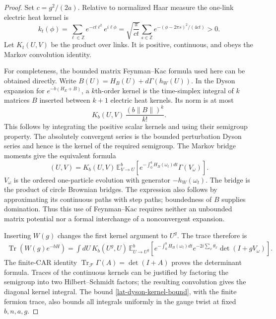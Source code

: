 \begin{proof}
Set $c=g^2/(2a)$.  Relative to normalized Haar measure the one-link
electric heat kernel is
\begin{equation}
 k_t(\phi)=\sum_{\ell\in\mathbb Z}e^{-ct\ell^2}e^{i\ell\phi}
  =\sqrt{\frac\pi{ct}}\sum_{s\in\mathbb Z}
           e^{-(\phi-2\pi s)^2/(4ct)}>0.
 \label{lat-positive-heat}
\end{equation}
Let $K_t(U,V)$ be the product over links.  It is positive, continuous,
and obeys the Markov convolution identity.

For completeness, the bounded matrix Feynman--Kac formula used here
can be obtained directly.  Write $B(U)=H_B(U)+d\Gamma(h_W(U))$.
In the Dyson expansion for $e^{-b(H_E+B)}$, a $k$th-order kernel is
the time-simplex integral of $k$ matrices $B$ inserted between
$k+1$ electric heat kernels.  Its norm is at most
\begin{equation}
 K_b(U,V)\,\frac{(b\|B\|)^k}{k!}.
 \label{lat-dyson-kernel-bound}
\end{equation}
This follows by integrating the positive scalar kernels and using their
semigroup property.  The absolutely convergent series is the bounded
perturbation Dyson series and hence is the kernel of the required
semigroup.  The Markov bridge moments give the equivalent formula
\begin{equation}
 [e^{-bH}](U,V)=K_b(U,V)\,\mathbb E_{V\to U}^{b}
 \left[e^{-\int_0^bH_B(\omega_t)dt}
       \Gamma(V_\omega)\right].
 \label{lat-matrix-fk}
\end{equation}
$V_\omega$ is the ordered one-particle evolution with generator
$-h_W(\omega_t)$.  The bridge is the product of circle Brownian bridges.
The expression also follows by approximating its continuous paths with
step paths; boundedness of $B$ supplies domination.  Thus this use of
Feynman--Kac requires neither an unbounded matrix potential nor a
formal interchange of a nonconvergent expansion.

Inserting $W(g)$ changes the first kernel argument to $U^g$.
The trace therefore is
\begin{align}
 \operatorname{Tr}(W(g)e^{-bH})
   =\int dU\,K_b(U^g,U)\,\mathbb E_{U\to U^g}^{b}
     \left[e^{-\int_0^bH_B(\omega_t)dt}
        e^{-2i\sum_x\theta_x}\det(I+gV_\omega)\right].
 \label{lat-twisted-trace}
\end{align}
The finite-CAR identity $\operatorname{Tr}_{\mathcal F}\Gamma(A)
=\det(I+A)$ proves the determinant formula.  Traces of the continuous
kernels can be justified by factoring the semigroup into two
Hilbert--Schmidt factors; the resulting convolution gives the diagonal
kernel integral.  The bound \eqref{lat-dyson-kernel-bound}, with the
finite fermion trace, also bounds all integrals uniformly in the gauge
twist at fixed $b,n,a,g$.


\end{proof}
